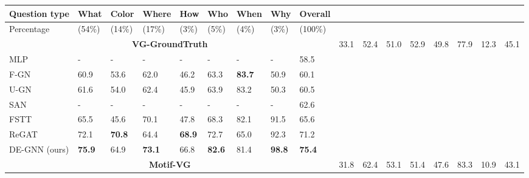 \documentclass[letterpaper]{article} %
\begin{document}

\begin{table}[ht]
\centering
    \begin{tabular}{l|lllllllll}
    \hline
    \textbf{Question type}&\textbf{What}&\textbf{Color}&\textbf{Where}&\textbf{How}&\textbf{Who}&\textbf{When}&\textbf{Why}&\textbf{Overall}\\
    \hline
     Percentage &(54\%) &(14\%) &(17\%) &(3\%) &(5\%) &(4\%) &(3\%) &(100\%)\\
    \hline
    \multicolumn{9}{c}{\bf VG-GroundTruth} \cr\hline %
     NSM~\cite{DBLP:conf/nips/HudsonM19} &33.1 &52.4 &51.0 &52.9 &49.8 &77.9 &12.3 &45.1\\
     MLP~\cite{DBLP:conf/eccv/JabriJM16} &- &- &- &- &- &- &- &58.5\\
     F-GN~\cite{DBLP:conf/bmvc/ZhangCX19}&60.9 &53.6 &62.0 &46.2 &63.3 &\textbf{83.7} &50.9 &60.1\\
     U-GN~\cite{DBLP:conf/bmvc/ZhangCX19}&61.6 &54.0 &62.4 &45.9 &63.9 & 83.2 &50.3 &60.5\\
     SAN~\cite{DBLP:conf/cvpr/YangHGDS16} &- &- &- &- &- &- &- &62.6\\
     FSTT~\cite{inproceedings} &65.5 &45.6 &70.1 &47.8 &68.3 &82.1 &91.5 &65.6\\
     ReGAT~\cite{DBLP:conf/iccv/LiGCL19} &72.1 &\textbf{70.8} &64.4 &\textbf{68.9} &72.7 &65.0 &92.3 &71.2\\
     DE-GNN (ours) &\textbf{75.9} &64.9 &\textbf{73.1} &66.8 &\textbf{82.6} &81.4 &\textbf{98.8} &\textbf{75.4}\\
    \hline
     \multicolumn{9}{c}{\bf Motif-VG} \cr\hline
     NSM~\cite{DBLP:conf/nips/HudsonM19} &31.8 &62.4 &53.1 &51.4 &47.6 &83.3 &10.9 &43.1\\

\end{tabular}
\end{table}
\end{document}
